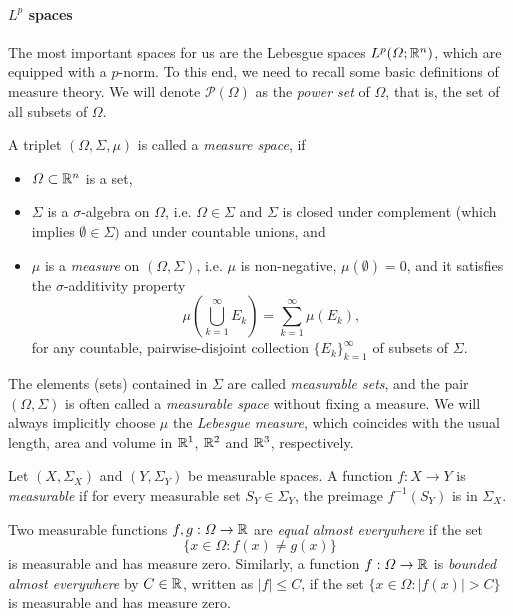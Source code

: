 \paragraph{$L^p$ spaces}
The most important spaces for us are the Lebesgue spaces $L^p(\Omega;\mathbb{R}^n)$, which are equipped with a $p$-norm. To this end, we need to recall some basic definitions of measure theory. We will denote $\mathcal{P}(\Omega)$ as the \emph{power set} of $\Omega$, that is, the set of all subsets of $\Omega$. 
\begin{definition}
    A triplet $(\Omega, \Sigma, \mu)$ is called a \emph{measure space}, if 
    \begin{itemize}
        \item $\Omega\subset\mathbb{R}^n$ is a set,
        \item $\Sigma$ is a $\sigma$-algebra on $\Omega$, i.e. $\Omega\in\Sigma$ and  $\Sigma$ is closed under complement (which implies $\emptyset\in\Sigma)$ and under countable unions, and
        \item $\mu$ is a \emph{measure} on $(\Omega,\Sigma)$, i.e. $\mu$ is non-negative, $\mu(\emptyset) = 0$, and it satisfies the $\sigma$-additivity property
        \begin{equation*}
            \mu\left(\bigcup_{k=1}^\infty E_k\right) = \sum_{k=1}^\infty \mu(E_k),
        \end{equation*}
        for any countable, pairwise-disjoint collection $\{E_k\}_{k=1}^\infty$ of subsets of $\Sigma$.
    \end{itemize}
    The elements (sets) contained in $\Sigma$ are called \emph{measurable sets}, and the pair $(\Omega,\Sigma)$ is often called a \emph{measurable space} without fixing a measure. We will always implicitly choose $\mu$ the \emph{Lebesgue measure}, which coincides with the usual length, area and volume in $\mathbb{R}^1$, $\mathbb{R}^2$ and $\mathbb{R}^3$, respectively. 
\end{definition}
\begin{definition}
    Let $(X,\Sigma_X)$ and $(Y, \Sigma_Y)$ be measurable spaces. A function $f:X\to Y$ is \emph{measurable} if for every measurable set $S_Y\in\Sigma_Y$, the preimage $f^{-1}(S_Y)$ is in $\Sigma_X$. 
    
    Two measurable functions $f,g:\Omega\to\mathbb{R}$ are \emph{equal almost everywhere} if the set 
    \begin{equation*}
        \{x\in \Omega: f(x)\neq g(x)\}
    \end{equation*}
    is measurable and has measure zero. Similarly, a function $f:\Omega\to \mathbb{R}$ is \emph{bounded almost everywhere} by $C\in\mathbb{R}$, written as $|f|\leq C$, if the set $\{x\in\Omega: |f(x)|>C\}$ is measurable and has measure zero.
\end{definition}
